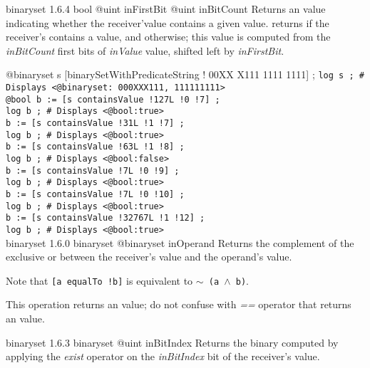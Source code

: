 {binaryset}
{1.6.4}
{bool}
{@uint inFirstBit}
{@uint inBitCount}
{Returns an  value indicating whether the receiver'value contains a given value.}
{returns  if the receiver's contains a value, and  otherwise; this value is computed from the \emph{inBitCount} first bits of \emph{inValue} value, shifted left by \emph{inFirstBit}.}


\exempleUneLigne
{}
{@binaryset s [binarySetWithPredicateString ! 00XX X111 1111 1111\textquotedbl] ;}
\texttt{log s ; \# Displays <@binaryset:~000XXX111, 111111111>}\\
\texttt{@bool b := [s containsValue !127L !0 !7] ;}\\
\texttt{log b ; \# Displays <@bool:true>}\\
\texttt{b := [s containsValue !31L !1 !7] ;}\\
\texttt{log b ; \# Displays <@bool:true>}\\
\texttt{b := [s containsValue !63L !1 !8] ;}\\
\texttt{log b ; \# Displays <@bool:false>}\\
\texttt{b := [s containsValue !7L !0 !9] ;}\\
\texttt{log b ; \# Displays <@bool:true>}\\
\texttt{b := [s containsValue !7L !0 !10] ;}\\
\texttt{log b ; \# Displays <@bool:true>}\\
\texttt{b := [s containsValue !32767L !1 !12] ;}\\
\texttt{log b ; \# Displays <@bool:true>}\\








{binaryset}
{1.6.0}
{binaryset}
{@binaryset inOperand}
{Returns the complement of the exclusive or between the receiver's value and the operand's value.}
{}

Note that \texttt{[a equalTo !b]} is equivalent to \texttt{$\sim$ (a $\wedge$ b)}.

This operation returns an  value; do not confuse with \emph{==} operator that returns an  value.







{binaryset}
{1.6.3}
{binaryset}
{@uint inBitIndex}
{Returns the binary computed by applying the \emph{exist} operator on the \emph{inBitIndex} bit of the receiver's value.}
{}







